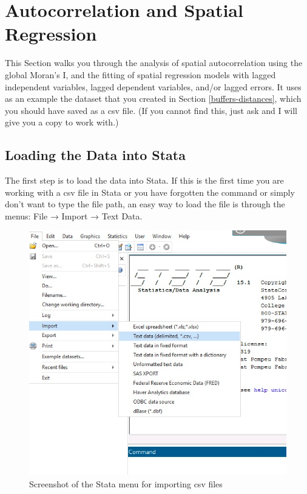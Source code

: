 \documentclass[]{book}
\begin{document}
\hypertarget{autocorrelation}{%
\chapter{Autocorrelation and Spatial Regression}\label{autocorrelation}}

This Section walks you through the analysis of spatial autocorrelation using the global Moran's I, and the fitting of spatial regression models with lagged independent variables, lagged dependent variables, and/or lagged errors. It uses as an example the dataset that you created in Section \ref{buffers-distances}, which you should have saved as a csv file. (If you cannot find this, just ask and I will give you a copy to work with.)

\hypertarget{loading-the-data-into-stata}{%
\section{Loading the Data into Stata}\label{loading-the-data-into-stata}}

The first step is to load the data into Stata. If this is the first time you are working with a csv file in Stata or you have forgotten the command or simply don't want to type the file path, an easy way to load the file is through the menus: File → Import → Text Data.

\begin{figure}
\centering
\includegraphics{images/stata_file_import.png}
\caption{Screenshot of the Stata menu for importing csv files}
\end{figure}
\end{document}
